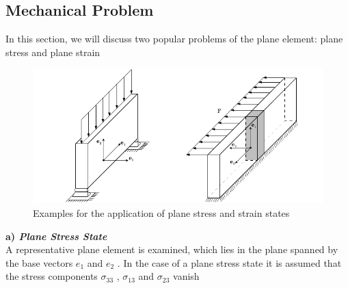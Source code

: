 \subsection{Mechanical Problem}
\label{planeproblem}
In this section, we will discuss  two popular problems of the plane element: plane stress and plane strain
\begin{figure}[H]
    \centering
    \includegraphics[scale=0.5]{Figures/Chapter2/110.png}
    \decoRule   
    \caption{ Examples for the application of plane stress and strain states}
    \label{fig:110}
\end{figure}
\vspace{0.38cm} \textbf{a) \textit{Plane Stress State}} \\
A representative plane element is examined, which lies in the plane spanned by the base vectors
$e_1$ and $e_2$ . In the case of a plane stress state it is assumed that the stress components $\sigma_{33}$ , $\sigma_{13}$ and $\sigma_{23}$ vanish

